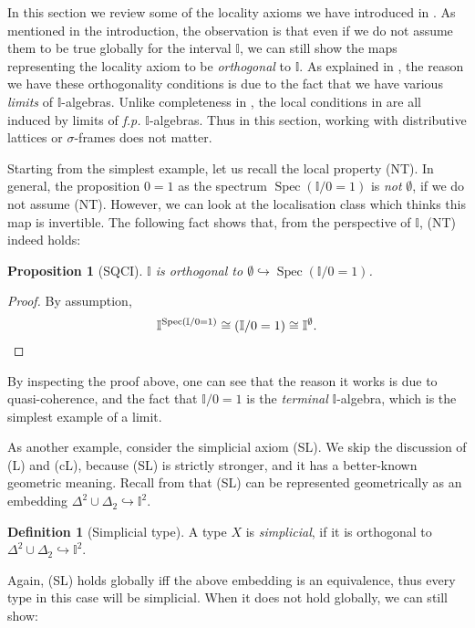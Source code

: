 \documentclass[12pt]{amsart}
\newtheorem{proposition}[theorem]{Proposition}
\theoremstyle{definition}
\newtheorem{definition}[theorem]{Definition}
\newcommand{\mbb}[1]{\mathbb{#1}}
\newcommand{\I}{\mbb I}
\newcommand{\hook}{\hookrightarrow}
\newcommand{\emp}{\emptyset}
\newcommand{\spec}{\operatorname{Spec}}
\begin{document}
In this section we review some of the locality axioms we have introduced in . As mentioned in the introduction, the observation is that even if we do not assume them to be true globally for the interval $\I$, we can still show the maps representing the locality axiom to be \emph{orthogonal} to $\I$. As explained in , the reason we have these orthogonality conditions is due to the fact that we have various \emph{limits} of $\I$-algebras. Unlike completeness in , the local conditions in  are all induced by limits of \emph{f.p.} $\I$-algebras. Thus in this section, working with distributive lattices or $\sigma$-frames does not matter.

Starting from the simplest example, let us recall the local property (NT). In general, the proposition $0 = 1$ as the spectrum $\spec(\I/0=1)$ is \emph{not} $\emp$, if we do not assume (NT). However, we can look at the localisation class which thinks this map is invertible. The following fact shows that, from the perspective of $\I$, (NT) indeed holds:

\begin{proposition}[SQCI]\label{specisnontrivial}
  $\I$ is orthogonal to $\emp \hook \spec(\I/0=1)$.
\end{proposition}
\begin{proof}
  By assumption,
  \[ \I^{\spec(\I/0=1)} \cong (\I/0=1) \cong \I^\emp. \qedhere \]
\end{proof}

By inspecting the proof above, one can see that the reason it works is due to quasi-coherence, and the fact that $\I/0=1$ is the \emph{terminal} $\I$-algebra, which is the simplest example of a limit.

As another example, consider the simplicial axiom (SL). We skip the discussion of (L) and (cL), because (SL) is strictly stronger, and it has a better-known geometric meaning. Recall from  that (SL) can be represented geometrically as an embedding $\Delta^2\cup\Delta_2 \hook \I^2$.

\begin{definition}[Simplicial type]
  A type $X$ is \emph{simplicial}, if it is orthogonal to $\Delta^2 \cup \Delta_2 \hook \I^2$.
\end{definition}

Again, (SL) holds globally iff the above embedding is an equivalence, thus every type in this case will be simplicial. When it does not hold globally, we can still show:
\end{document}
